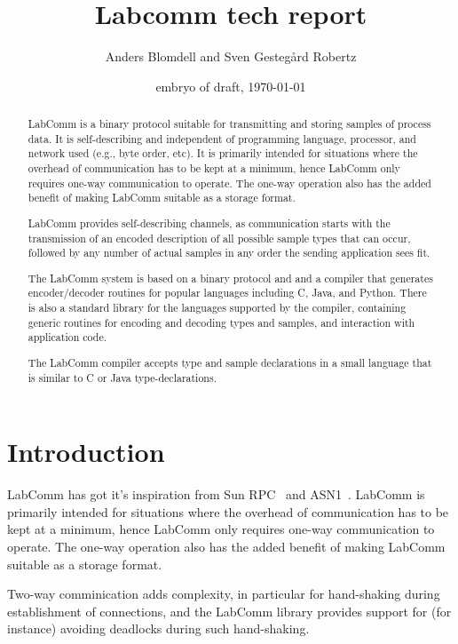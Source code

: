 \documentclass[a4paper]{article}
\begin{document}
\title{Labcomm tech report}
\author{Anders Blomdell and Sven Gesteg\aa{}rd Robertz }
\date{embryo of draft, \today}

\maketitle 

\begin{abstract}

LabComm is a binary protocol suitable for transmitting and storing samples of
process data. It is self-describing and independent of programming language,
processor, and network used (e.g., byte order, etc).  It is primarily intended
for situations where the overhead of communication has to be kept at a minimum,
hence LabComm only requires one-way communication to operate. The one-way
operation also has the added benefit of making LabComm suitable as a storage
format. 

LabComm provides self-describing channels, as communication starts with the
transmission of an encoded description of all possible sample types that can
occur, followed by any number of actual samples in any order the sending
application sees fit.

The LabComm system is based on a binary protocol and
and a compiler that generates encoder/decoder routines for popular languages
including C, Java, and Python. There is also a standard library for the
languages supported by the compiler, containing generic routines for
encoding and decoding types and samples, and interaction with
application code.

The LabComm compiler accepts type and sample declarations in a small language
that is similar to C or Java type-declarations. 
\end{abstract}
\section{Introduction}


LabComm has got it's inspiration from Sun RPC~\cite{SunRPC}
and ASN1~\cite{ANS1}. LabComm is primarily intended for situations
where the overhead of communication has to be kept at a minimum, hence LabComm
only requires one-way communication to operate. The one-way operation also has
the added benefit of making LabComm suitable as a storage format. 

Two-way comminication adds complexity, in particular for hand-shaking
during establishment of connections, and the LabComm library provides
support for (for instance) avoiding deadlocks during such hand-shaking.
\end{document}
